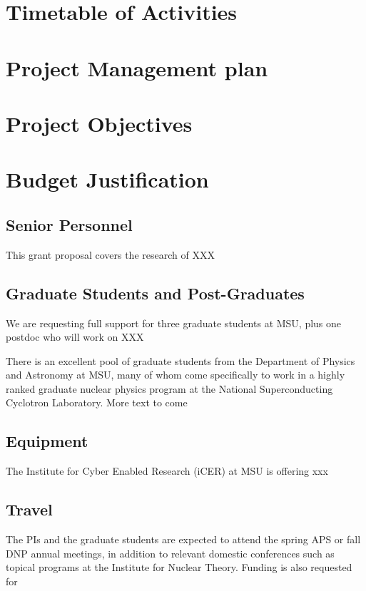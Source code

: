 \documentclass[10pt]{article}
\begin{document}
\section{Timetable of Activities}

\section{Project Management plan}

\section{Project Objectives}


\section{Budget Justification}


\subsection{Senior Personnel}

This grant proposal covers the research of XXX

\subsection{Graduate Students and Post-Graduates} 

We are requesting full support for three graduate  students at
MSU, plus one postdoc who will work on XXX

There is an excellent pool of graduate students from the Department of
Physics and Astronomy at MSU, many of whom come specifically to work
in a highly ranked graduate nuclear physics program at the National
Superconducting Cyclotron Laboratory. 
More text to come

\subsection{Equipment}
The Institute for Cyber Enabled Research (iCER) at MSU is offering xxx

\subsection{Travel}

The PIs and the graduate students are expected to attend the spring
APS or fall DNP annual meetings, in addition to relevant domestic
conferences such as topical programs at the Institute for Nuclear
Theory. Funding is also requested for
\end{document}
